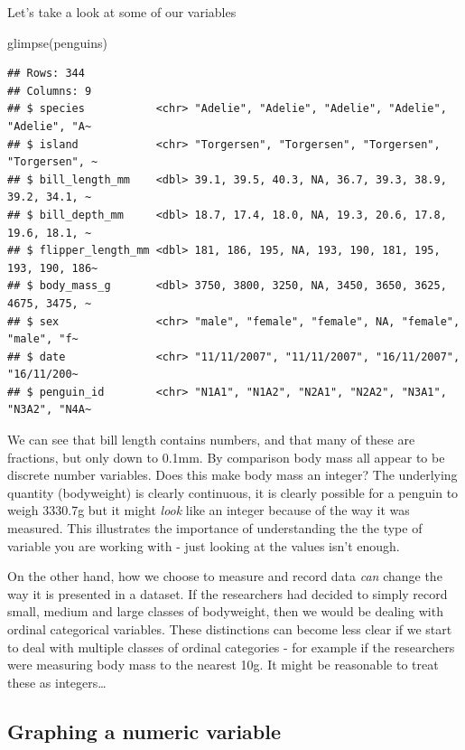 \documentclass[
]{book}
\newenvironment{Shaded}{\begin{snugshade}}{\end{snugshade}}
\newcommand{\FunctionTok}[1]{\textcolor[rgb]{0.00,0.00,0.00}{#1}}
\newcommand{\NormalTok}[1]{#1}
\begin{document}
Let's take a look at some of our variables

\begin{Shaded}
\begin{Highlighting}[]
\FunctionTok{glimpse}\NormalTok{(penguins)}
\end{Highlighting}
\end{Shaded}

\begin{verbatim}
## Rows: 344
## Columns: 9
## $ species           <chr> "Adelie", "Adelie", "Adelie", "Adelie", "Adelie", "A~
## $ island            <chr> "Torgersen", "Torgersen", "Torgersen", "Torgersen", ~
## $ bill_length_mm    <dbl> 39.1, 39.5, 40.3, NA, 36.7, 39.3, 38.9, 39.2, 34.1, ~
## $ bill_depth_mm     <dbl> 18.7, 17.4, 18.0, NA, 19.3, 20.6, 17.8, 19.6, 18.1, ~
## $ flipper_length_mm <dbl> 181, 186, 195, NA, 193, 190, 181, 195, 193, 190, 186~
## $ body_mass_g       <dbl> 3750, 3800, 3250, NA, 3450, 3650, 3625, 4675, 3475, ~
## $ sex               <chr> "male", "female", "female", NA, "female", "male", "f~
## $ date              <chr> "11/11/2007", "11/11/2007", "16/11/2007", "16/11/200~
## $ penguin_id        <chr> "N1A1", "N1A2", "N2A1", "N2A2", "N3A1", "N3A2", "N4A~
\end{verbatim}

We can see that bill length contains numbers, and that many of these are fractions, but only down to 0.1mm. By comparison body mass all appear to be discrete number variables. Does this make body mass an integer? The underlying quantity (bodyweight) is clearly continuous, it is clearly possible for a penguin to weigh 3330.7g but it might \emph{look} like an integer because of the way it was measured. This illustrates the importance of understanding the the type of variable you are working with - just looking at the values isn't enough.

On the other hand, how we choose to measure and record data \emph{can} change the way it is presented in a dataset. If the researchers had decided to simply record small, medium and large classes of bodyweight, then we would be dealing with ordinal categorical variables. These distinctions can become less clear if we start to deal with multiple classes of ordinal categories - for example if the researchers were measuring body mass to the nearest 10g. It might be reasonable to treat these as integers\ldots{}

\hypertarget{graphing-a-numeric-variable}{%
\subsection{Graphing a numeric variable}\label{graphing-a-numeric-variable}}
\end{document}
